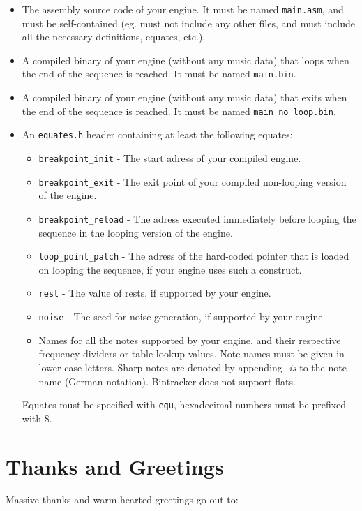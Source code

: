 \documentclass[12pt]{report}	%
\begin{document}
\begin{itemize}
\item The assembly source code of your engine. It must be named \texttt{main.asm}, and must be self-contained (eg. must not include any other files, and must include all the necessary definitions, equates, etc.).
\item A compiled binary of your engine (without any music data) that loops when the end of the sequence is reached. It must be named \texttt{main.bin}.
\item A compiled binary of your engine (without any music data) that exits when the end of the sequence is reached. It must be named \allowbreak\texttt{main\_no\_loop.bin}.
\item An \texttt{equates.h} header containing at least the following equates:
\begin{itemize}
\item \texttt{breakpoint\_init} - The start adress of your compiled engine.
\item \texttt{breakpoint\_exit} - The exit point of your compiled non-looping version of the engine.
\item \texttt{breakpoint\_reload} - The adress executed immediately before looping the sequence in the looping version of the engine.
\item \texttt{loop\_point\_patch} - The adress of the hard-coded pointer that is loaded on looping the sequence, if your engine uses such a construct.
\item \texttt{rest} - The value of rests, if supported by your engine.
\item \texttt{noise} - The seed for noise generation, if supported by your engine.
\item Names for all the notes supported by your engine, and their respective frequency dividers or table lookup values. Note names must be given in lower-case letters. Sharp notes are denoted by appending \textit{-is} to the note name (German notation). Bintracker does not support flats.
\end{itemize}
Equates must be specified with \texttt{equ}, hexadecimal numbers must be prefixed with \$.
\end{itemize}


\chapter{Thanks and Greetings}

Massive thanks and warm-hearted greetings go out to:
\end{document}
